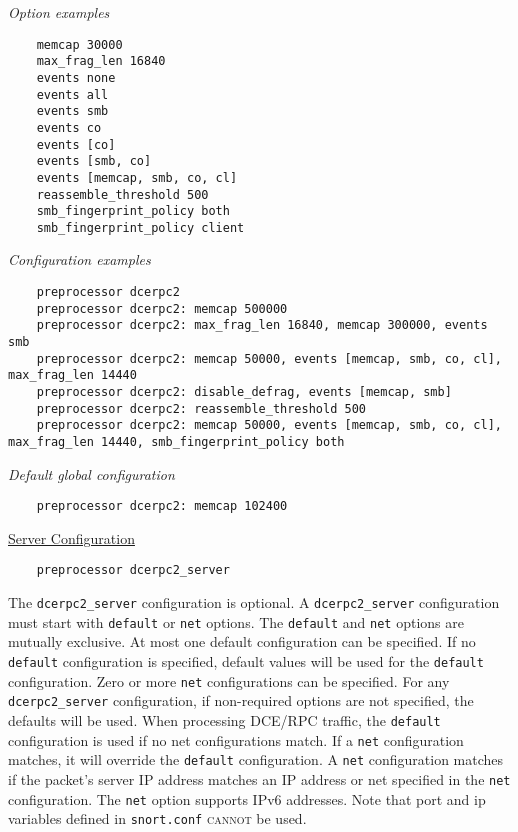 \documentclass[english]{report}
\begin{document}
\textit{Option examples}
\footnotesize
\begin{verbatim}
    memcap 30000
    max_frag_len 16840
    events none
    events all
    events smb
    events co
    events [co]
    events [smb, co]
    events [memcap, smb, co, cl]
    reassemble_threshold 500
    smb_fingerprint_policy both
    smb_fingerprint_policy client
\end{verbatim}
\normalsize

\textit{Configuration examples}
\footnotesize
\begin{verbatim}
    preprocessor dcerpc2
    preprocessor dcerpc2: memcap 500000
    preprocessor dcerpc2: max_frag_len 16840, memcap 300000, events smb
    preprocessor dcerpc2: memcap 50000, events [memcap, smb, co, cl], max_frag_len 14440
    preprocessor dcerpc2: disable_defrag, events [memcap, smb]
    preprocessor dcerpc2: reassemble_threshold 500
    preprocessor dcerpc2: memcap 50000, events [memcap, smb, co, cl], max_frag_len 14440, smb_fingerprint_policy both
\end{verbatim}
\normalsize

\textit{Default global configuration}
\footnotesize
\begin{verbatim}
    preprocessor dcerpc2: memcap 102400
\end{verbatim}
\normalsize

\underline{Server Configuration}

\begin{verbatim}
    preprocessor dcerpc2_server
\end{verbatim}

The \texttt{dcerpc2\_server} configuration is optional.  A
\texttt{dcerpc2\_server} configuration must start with \texttt{default} or
\texttt{net} options.  The \texttt{default} and \texttt{net} options are
mutually exclusive.  At most one default configuration can be specified. If no
\texttt{default} configuration is specified, default values will be used for
the \texttt{default} configuration.  Zero or more \texttt{net} configurations
can be specified.  For any \texttt{dcerpc2\_server} configuration, if
non-required options are not specified, the defaults will be used.  When
processing DCE/RPC traffic, the \texttt{default} configuration is used if no
net configurations match.  If a \texttt{net} configuration matches, it will
override the \texttt{default} configuration. A \texttt{net} configuration
matches if the packet's server IP address matches an IP address or net
specified in the \texttt{net} configuration.  The \texttt{net} option supports
IPv6 addresses.  Note that port and ip variables defined in \texttt{snort.conf}
\textsc{cannot} be used.
\end{document}
